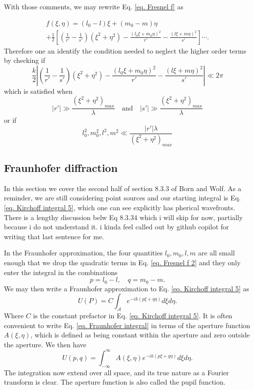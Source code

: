 \documentclass[../../main.tex]{subfiles} %
\begin{document}
With those comments, we may rewrite Eq. \ref{eq. Fresnel f} as

\begin{multline}\label{eq. Fresnel f 2}
    f(\xi,\eta)=(l_0-l)\xi+(m_0-m)\eta\\
    +\frac{1}{2}\left[\left( \frac{1}{r'}-\frac{1}{s'}\right)(\xi^2+\eta^2)-\frac{(l_0\xi+m_0\eta)^2}{r'}-\frac{(l\xi+m\eta)^2}{s'}\right]\cdots.
\end{multline}    
Therefore one an identify the condition needed to neglect the higher order terms by checking if 
\begin{equation}
    \frac{k}{2}\left|\left( \frac{1}{r'}-\frac{1}{s'}\right)(\xi^2+\eta^2)-\frac{(l_0\xi+m_0\eta)^2}{r'}-\frac{(l\xi+m\eta)^2}{s'}\right|\ll2\pi
\end{equation}
which is satisfied when 
\begin{equation}
    |r'|\gg\frac{(\xi^2+\eta^2)_{max}}{\lambda}\quad \text{and} \quad |s'|\gg\frac{(\xi^2+\eta^2)_{max}}{\lambda}
\end{equation}
or if 
\begin{equation}
    l_0^2,m_0^2,l^2,m^2\ll\frac{|r'|\lambda}{(\xi^2+\eta^2)_{max}}
\end{equation}

\subsection{Fraunhofer diffraction}
In this section we cover the second half of section 8.3.3 of Born and Wolf. As a reminder, we are still considering point sources and our starting integral is Eq. \ref{eq. Kirchoff integral 5}, which one can see explicitly has pherical wavefronts. There is a lengthy discussion belw Eq 8.3.34 which i will skip for now, partially because i do not understand it. i kinda feel called out by github copilot for writing that last sentence for me. 

In the Fraunhofer approximation, the four quantities $l_0,m_0,l,m$ are all small enough that we drop the quadratic terms in Eq. \ref{eq. Fresnel f 2} and they only enter the integral in the combinations $$p=l_0-l, \quad q=m_0-m.$$ We may then write a Fraunhofer approximation to Eq. \ref{eq. Kirchoff integral 5} as
\begin{equation} \label{eq. Fraunhofer integral}
    U(P)=C\int_{\mathcal{A}}e^{-ik(p\xi+q\eta)}d\xi d\eta.
\end{equation}
Where $C$ is the constant prefactor in Eq. \ref{eq. Kirchoff integral 5}. It is often convenient to write Eq. \ref{eq. Fraunhofer integral} in terms of the aperture function $A(\xi,\eta)$, which is defined as being constant within the aperture and zero outside the aperture. We then have
\begin{equation} \label{eq. Fraunhofer integral 2}
    U(p,q)=\int_{-\infty}^{\infty}A(\xi,\eta)e^{-ik(p\xi+q\eta)}d\xi d\eta.
\end{equation}
The integration now extend over all space, and its true nature as a Fourier transform is clear. The aperture function is also called the pupil function.
\end{document}

